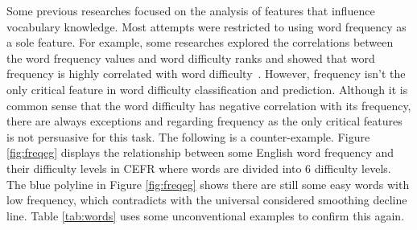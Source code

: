 Some previous researches focused on the analysis of features that influence vocabulary knowledge.
Most attempts were restricted to using word frequency as a sole feature.
For example, some researches explored the correlations between the 
word frequency values and word difficulty ranks and showed that 
word frequency is highly correlated with word difficulty~\cite{breland1996word,ryder1988relationship,chang2018learning}.
However, frequency isn't the only critical feature in 
word difficulty classification and prediction.  
Although it is common sense that the word difficulty 
has negative correlation with its frequency, there are always 
exceptions and regarding frequency as the only critical features 
is not persuasive for this task. The following is a counter-example.
Figure \ref{fig:freqeg}
displays the relationship between some English word frequency and their difficulty levels in CEFR where words are divided into 6 difficulty levels.
The blue polyline in Figure \ref{fig:freqeg} shows there are still some 
easy words with low frequency, which contradicts with the universal considered
smoothing decline line.
Table \ref{tab:words} uses some unconventional examples to confirm this again.

